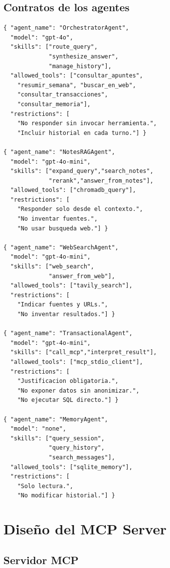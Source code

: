 \documentclass[conference]{IEEEtran}
\begin{document}
\subsection{Contratos de los agentes}

\begin{verbatim}
{ "agent_name": "OrchestratorAgent",
  "model": "gpt-4o",
  "skills": ["route_query",
             "synthesize_answer",
             "manage_history"],
  "allowed_tools": ["consultar_apuntes",
    "resumir_semana", "buscar_en_web",
    "consultar_transacciones",
    "consultar_memoria"],
  "restrictions": [
    "No responder sin invocar herramienta.",
    "Incluir historial en cada turno."] }

{ "agent_name": "NotesRAGAgent",
  "model": "gpt-4o-mini",
  "skills": ["expand_query","search_notes",
             "rerank","answer_from_notes"],
  "allowed_tools": ["chromadb_query"],
  "restrictions": [
    "Responder solo desde el contexto.",
    "No inventar fuentes.",
    "No usar busqueda web."] }

{ "agent_name": "WebSearchAgent",
  "model": "gpt-4o-mini",
  "skills": ["web_search",
             "answer_from_web"],
  "allowed_tools": ["tavily_search"],
  "restrictions": [
    "Indicar fuentes y URLs.",
    "No inventar resultados."] }

{ "agent_name": "TransactionalAgent",
  "model": "gpt-4o-mini",
  "skills": ["call_mcp","interpret_result"],
  "allowed_tools": ["mcp_stdio_client"],
  "restrictions": [
    "Justificacion obligatoria.",
    "No exponer datos sin anonimizar.",
    "No ejecutar SQL directo."] }

{ "agent_name": "MemoryAgent",
  "model": "none",
  "skills": ["query_session",
             "query_history",
             "search_messages"],
  "allowed_tools": ["sqlite_memory"],
  "restrictions": [
    "Solo lectura.",
    "No modificar historial."] }
\end{verbatim}

\section{Diseño del MCP Server}

\subsection{Servidor MCP}
\end{document}
